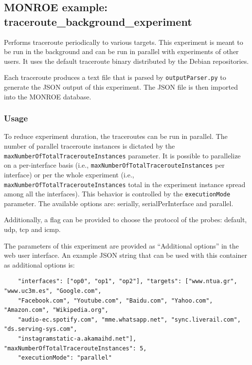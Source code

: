 \documentclass[a4paper,10pt]{article}
\newcommand{\VerbatimFont}{\footnotesize}
\newcommand{\monroe}{MONROE}
\newcommand{\identifier}[1]{{\texttt{\small{#1}}}}
\begin{document}
\subsection{\monroe{} example: traceroute\_background\_experiment}

Performs traceroute periodically to various targets.
This experiment is meant to be run in the background and can be run in parallel with experiments of other users.
It uses the default traceroute binary distributed by the Debian repositories.

Each traceroute produces a text file that is parsed by \identifier{outputParser.py} to generate the JSON output of this experiment.
The JSON file is then imported into the \monroe{} database.

\subsubsection{Usage}

To reduce experiment duration, the traceroutes can be run in parallel.
The number of parallel traceroute instances is dictated by the \identifier{maxNumberOfTotalTracerouteInstances} parameter.
It is possible to parallelize on a per-interface basis (i.e., \identifier{maxNumberOfTotalTracerouteInstances} per interface) or per the whole experiment (i.e., \identifier{maxNumberOfTotalTracerouteInstances} total in the experiment instance spread among all the interfaces).
This behavior is controlled by the \identifier{executionMode} parameter.
The available options are: serially, serialPerInterface and parallel.

Additionally, a flag can be provided to choose the protocol of the probes: default, udp, tcp and icmp.

The parameters of this experiment are provided as ``Additional options'' in the web user interface.
An example JSON string that can be used with this container as additional options is:

{\VerbatimFont
	\begin{verbatim}
	"interfaces": ["op0", "op1", "op2"], "targets": ["www.ntua.gr", "www.uc3m.es", "Google.com", 
	"Facebook.com", "Youtube.com", "Baidu.com", "Yahoo.com", "Amazon.com", "Wikipedia.org", 
	"audio-ec.spotify.com", "mme.whatsapp.net", "sync.liverail.com", "ds.serving-sys.com", 
	"instagramstatic-a.akamaihd.net"], "maxNumberOfTotalTracerouteInstances": 5, 
	"executionMode": "parallel"
	\end{verbatim}}
\end{document}
